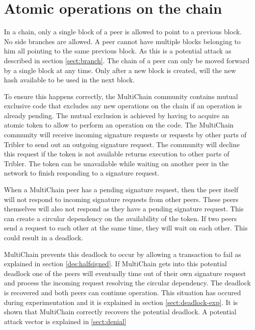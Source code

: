 \section{Atomic operations on the chain}
\label{sect:deadlock}
In a chain, only a single block of a peer is allowed to point to a previous block.
No side branches are allowed.
A peer cannot have multiple blocks belonging to him all pointing to the same previous block.
As this is a potential attack as described in section \ref{sect:branch}.
The chain of a peer can only be moved forward by a single block at any time.
Only after a new block is created, will the new hash available to be used in the next block.

To ensure this happens correctly, the MultiChain community contains mutual exclusive code
that excludes any new operations on the chain if an operation is already pending.
The mutual exclusion is achieved by having to acquire an atomic token to allow to perform an operation on the code.
The MultiChain community will receive incoming signature requests
or requests by other parts of Tribler to send out an outgoing signature request.
The community will decline this request if the token is not available
returns execution to other parts of Tribler.
The token can be unavailable while waiting on another peer in the network to finish responding to a signature request.

When a MultiChain peer has a pending signature request,
then the peer itself will not respond to incoming signature requests from other peers.
These peers themselves will also not respond as they have a pending signature request.
This can create a circular dependency on the availability of the token.
If two peers send a request to each other at the same time, they will wait on each other.
This could result in a deadlock.

MultiChain prevents this deadlock to occur by allowing a transaction to fail
as explained in section \ref{des:halfsigned}.
If MultiChain gets into this potential deadlock one of the peers will eventually time out of their own signature request
and process the incoming request resolving the circular dependency.
The deadlock is recovered and both peers can continue operation.
This situation has occured during experimentation and it is explained in section \ref{sect:deadlock-exp}.
It is shown that MultiChain correctly recovers the potential deadlock.
A potential attack vector is explained in \ref{sect:denial}

